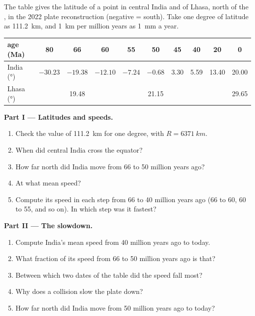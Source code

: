 \begin{problem}
\label{pb:g12:mountain-building:1}
The table gives the latitude of a point in central India and of Lhasa,
north of the , in the 2022 plate reconstruction (negative = south).
Take one degree of latitude as \qty{111.2}{km}, and \qty{1}{km} per million
years as \qty{1}{mm} a year.

\begin{center}
\small
\begin{tabular}{|l|c|c|c|c|c|c|c|c|c|}
\hline
age (\unit{Ma}) & 80 & 66 & 60 & 55 & 50 & 45 & 40 & 20 & 0 \\ \hline
India (\unit{\degree}) & $-30.23$ & $-19.38$ & $-12.10$ & $-7.24$ & $-0.68$ & 3.30 & 5.59 & 13.40 & 20.00 \\ \hline
Lhasa (\unit{\degree}) & & 19.48 & & & 21.15 & & & & 29.65 \\ \hline
\end{tabular}
\end{center}

\medskip
\noindent\textbf{Part I --- Latitudes and speeds.}
\begin{enumerate}
  \item Check the value of \qty{111.2}{km} for one degree, with $R =
        \qty{6371}{km}$.
  \item When did central India cross the equator?
  \item How far north did India move from 66 to 50 million years ago?
  \item At what mean speed?
  \item Compute its speed in each step from 66 to 40 million years ago (66
        to 60, 60 to 55, and so on). In which step was it fastest?
\end{enumerate}

\medskip
\noindent\textbf{Part II --- The slowdown.}
\begin{enumerate}[resume]
  \item Compute India's mean speed from 40 million years ago to today.
  \item What fraction of its speed from 66 to 50 million years ago is that?
  \item Between which two dates of the table did the speed fall most?
  \item Why does a collision slow the plate down?
  \item How far north did India move from 50 million years ago to today?
\end{enumerate}


\end{problem}
